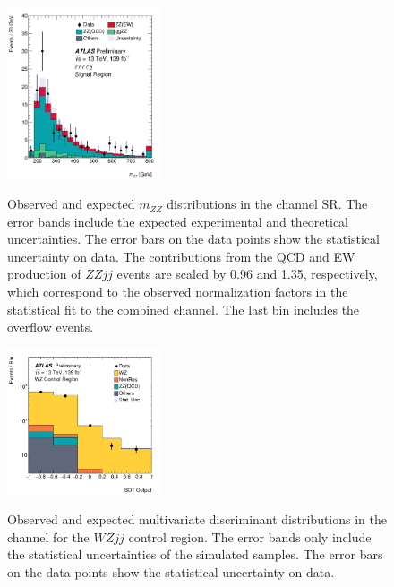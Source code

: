 \begin{figure}[!htbp]
\begin{center}
\includegraphics[width=0.4\textwidth]{figures/4l/MZZ_4l_SR.pdf} \\
\end{center}
\caption{Observed and expected $m_{ZZ}$ distributions in the \lllljj channel SR. 
        The error bands include the expected experimental and theoretical uncertainties.
        The error bars on the data points show the statistical uncertainty on data.
        The contributions from the QCD and EW production of $ZZjj$ events are scaled by 0.96 and 1.35, respectively, 
        which correspond to the observed normalization factors in the statistical fit to the combined channel.
        The last bin includes the overflow events.
        }
\label{fig:mZZ}
\end{figure}

\begin{figure}[!htbp]
\begin{center}
\includegraphics[width=0.4\textwidth]{figures/llvv/BDT_2l2v_3lCR.pdf} \\
\end{center}
\caption{Observed and expected multivariate discriminant distributions in the \llvvjj channel for 
        the $WZjj$
        control region.
        The error bands only include the statistical uncertainties of the simulated samples.
        The error bars on the data points show the statistical uncertainty on data.
        }
\label{fig:MVA_2l2v_CR}
\end{figure}

